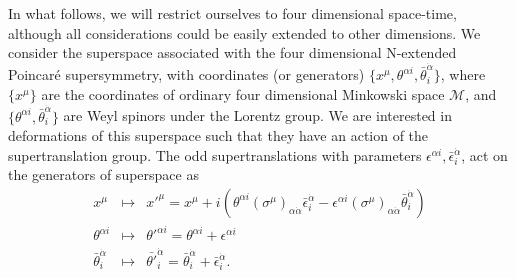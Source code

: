 \documentclass[a4paper,12pt]{article}
\begin{document}
In what follows, we will restrict ourselves to four dimensional
space-time, although 
all considerations could be easily extended to other dimensions.                                                 
We consider   the  superspace associated  with the four dimensional
 N-extended Poincar\'e 
supersymmetry, with coordinates (or generators) $\{x^\mu,\theta^{\alpha
i},
\bar\theta^{\dot\alpha }_i\}$, where $\{x^\mu\}$ are the  coordinates of
ordinary four 
dimensional Minkowski space $\mathcal{M}$,   and $\{\theta^{\alpha i},
\bar\theta^{\dot\alpha }_i\}$ are Weyl spinors under the Lorentz group.
We are interested in 
deformations of this superspace such that they have an action of the
supertranslation group.
 The odd supertranslations with parameters $\epsilon^{\alpha i},\bar 
\epsilon^{\dot\alpha }_i$, act on the generators of superspace as
\begin{eqnarray}
x^\mu &\mapsto& {x'}^\mu=x^\mu +i(\theta^{\alpha
i}(\sigma^\mu)_{\alpha\dot\alpha}
\bar\epsilon^{\dot\alpha }_i-\epsilon^{\alpha
i}(\sigma^\mu)_{\alpha\dot\alpha}
\bar\theta^{\dot\alpha }_i)\nonumber\\
\theta^{\alpha i}&\mapsto& {\theta'}^{\alpha i}=\theta^{\alpha
i}+\epsilon^{\alpha i}
\nonumber\\
\bar\theta^{\dot\alpha }_i&\mapsto&{\bar{\theta'}}^{\dot\alpha
}_i=\bar\theta^{\dot\alpha }_i+\bar
\epsilon^{\dot\alpha }_i.
\label{susy}
\end{eqnarray}
\end{document}

